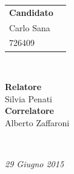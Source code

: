 \begin{titlepage}
 \vspace{8.7cm}

\begin{minipage}{0.4\textwidth}
\begin{flushleft} \large

\begin{tabular}{l r }
\textbf{Candidato} \\

\textsf{Carlo Sana}  &
\\
\textsf{726409} & 

\end{tabular}

\end{flushleft}

\vfill
\end{minipage}
~
\begin{minipage}{0.4\textwidth}
\begin{flushright} \large
\textbf{Relatore} \\
\textsf{Silvia Penati}
\\[0.5cm]
\textbf{Correlatore}\\
\textsf{Alberto Zaffaroni}
\end{flushright}
\end{minipage}\\

\vfill


{\large \textit{29 Giugno 2015}}


 
%

\end{titlepage}